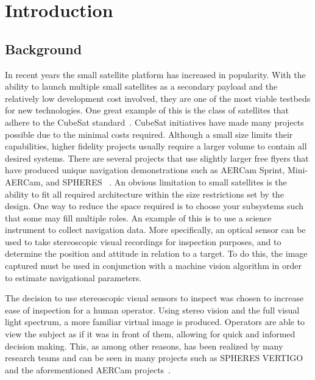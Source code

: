 \documentclass[journal, 10pt]{IEEEtran}
\begin{document}
\section{Introduction}

\subsection{Background}
In recent years the small satellite platform has increased in popularity. With the ability to launch multiple small satellites as a secondary payload and the relatively low development cost involved, they are one of the most viable testbeds for new technologies.  One great example of this is the class of satellites that adhere to the CubeSat standard~\cite{CubeSat}.   CubeSat initiatives have made many projects possible due to the minimal costs required.  Although a small size limits their capabilities, higher fidelity projects usually require a larger volume to contain all desired systems.  There are several projects that use slightly larger free flyers that have produced unique navigation demonstrations such as AERCam Sprint, Mini-AERCam, and SPHERES ~\cite{Aercam, MiniAercam, SPHERES}. An obvious limitation to small satellites is the ability to fit all required architecture within the size restrictions set by the design.  One way to reduce the space required is to choose your subsystems such that some may fill multiple roles.  An example of this is to use a science instrument to collect navigation data.  More specifically, an optical sensor can be used to take stereoscopic visual recordings for inspection purposes, and to determine the position and attitude in relation to a target.  To do this, the image captured must be used in conjunction with a machine vision algorithm in order to estimate navigational parameters.

The decision to use stereoscopic visual sensors to inspect was chosen to increase ease of inspection for a human operator.  Using stereo vision and the full visual light spectrum, a more familiar virtual image is produced.  Operators are able to view the subject as if it was in front of them, allowing for quick and informed decision making.  This, as among other reasons, has been realized by many research teams and can be seen in many projects such as SPHERES VERTIGO and the aforementioned AERCam projects~\cite{Aercam,MiniAercam, Vertigo1}.
\end{document}
